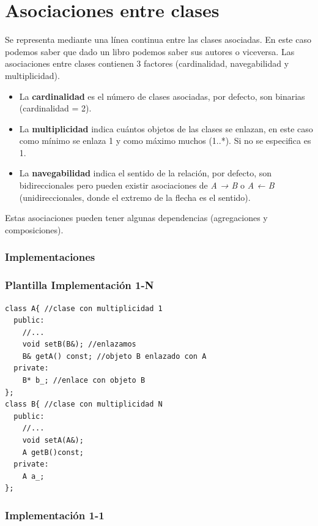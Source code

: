 \chapter{Asociaciones entre clases}


Se representa mediante una línea continua entre las clases asociadas.
En este caso podemos saber que dado un libro podemos saber sus autores o viceversa.
Las asociaciones entre clases contienen 3 factores (cardinalidad, navegabilidad y multiplicidad).
\begin{itemize}
	\item La \textbf{cardinalidad} es el número de clases asociadas, por defecto, son binarias (cardinalidad = 2).
	\item La \textbf{multiplicidad} indica cuántos objetos de las clases se enlazan, en este caso como mínimo se enlaza 1 y como máximo muchos (1..*). Si no se especifica es 1.
	\item La \textbf{navegabilidad} indica el sentido de la relación, por defecto, son bidireccionales pero pueden existir asociaciones de \textit{A → B} o \textit{A ← B} (unidireccionales, donde el extremo de la flecha es el sentido).
\end{itemize}
Estas asociaciones pueden tener algunas dependencias (agregaciones y composiciones).
\subsection{Implementaciones}
\begin{itemize}
\subsection{Plantilla Implementación 1-N}
\end{itemize}
\begin{center}
\begin{lstlisting}[frame=single]
class A{ //clase con multiplicidad 1
  public:
    //...
    void setB(B&); //enlazamos
    B& getA() const; //objeto B enlazado con A
  private:
    B* b_; //enlace con objeto B
};
class B{ //clase con multiplicidad N
  public:
    //...
    void setA(A&);
    A getB()const;
  private:
    A a_;
};
\end{lstlisting}
\end{center}
\newpage
\subsection{Implementación 1-1}

